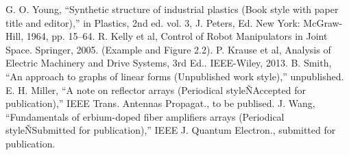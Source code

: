 \documentclass[a4paper, 10pt, journal]{ieeeconf}
\begin{document}
\begin{thebibliography}{99}

 G. O. Young, ``Synthetic structure of industrial plastics (Book style with paper title and editor),'' 	in Plastics, 2nd ed. vol. 3, J. Peters, Ed.  New York: McGraw-Hill, 1964, pp. 15--64.
 R. Kelly et al, Control of Robot Manipulators in Joint Space. Springer, 2005. (Example and Figure 2.2).
 P. Krause et al, Analysis of Electric Machinery and Drive Systems, 3rd Ed.. IEEE-Wiley, 2013.
 B. Smith, ``An approach to graphs of linear forms (Unpublished work style),'' unpublished.
 E. H. Miller, ``A note on reflector arrays (Periodical styleÑAccepted for publication),'' IEEE Trans. Antennas Propagat., to be publised.
 J. Wang, ``Fundamentals of erbium-doped fiber amplifiers arrays (Periodical styleÑSubmitted for publication),'' IEEE J. Quantum Electron., submitted for publication.

\end{thebibliography}
\end{document}
